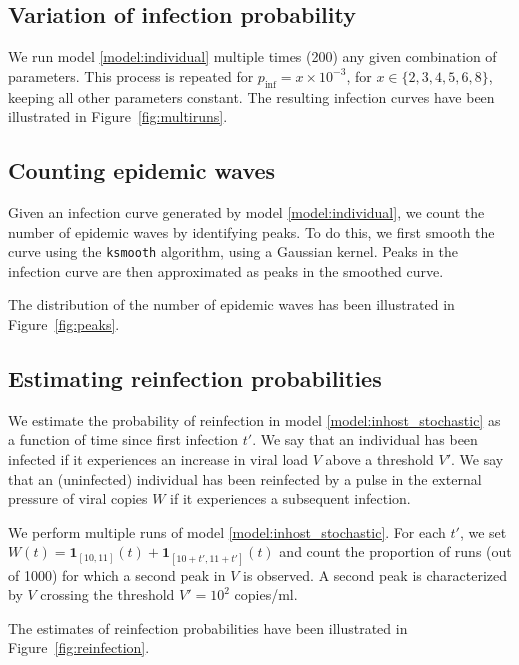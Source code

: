 \documentclass[11pt]{article}
\numberwithin{equation}{subsection}
\begin{document}
    \subsection{Variation of infection probability}

    We run model \ref{model:individual} multiple times (200) any given
    combination of parameters. This process is repeated for $p_\text{inf} = x
    \times 10^{-3}$, for $x \in \{2, 3, 4, 5, 6, 8\}$, keeping all other
    parameters constant. The resulting infection curves have been illustrated
    in Figure~\ref{fig:multiruns}.


    \subsection{Counting epidemic waves}

    Given an infection curve generated by model \ref{model:individual}, we
    count the number of epidemic waves by identifying peaks. To do this, we
    first smooth the curve using the \texttt{ksmooth} algorithm, using a
    Gaussian kernel. Peaks in the infection curve are then approximated as
    peaks in the smoothed curve.

    The distribution of the number of epidemic waves has been illustrated in
    Figure~\ref{fig:peaks}.


    \subsection{Estimating reinfection probabilities}

    We estimate the probability of reinfection in model
    \ref{model:inhost_stochastic} as a function of time since first infection
    $t'$. We say that an individual has been infected if it experiences an
    increase in viral load $V$ above a threshold $V'$. We say that an
    (uninfected) individual has been reinfected by a pulse in the external
    pressure of viral copies $W$ if it experiences a subsequent infection.

    We perform multiple runs of model \ref{model:inhost_stochastic}.  For each
    $t'$, we set $W(t) = \mathbf{1}_{[10, 11]}(t) + \mathbf{1}_{[10 + t', 11 +
    t']}(t)$ and count the proportion of runs (out of 1000) for which a second
    peak in $V$ is observed. A second peak is characterized by $V$ crossing
    the threshold $V' = 10^2$ copies/ml.

    The estimates of reinfection probabilities have been illustrated in
    Figure~\ref{fig:reinfection}.
\end{document}

